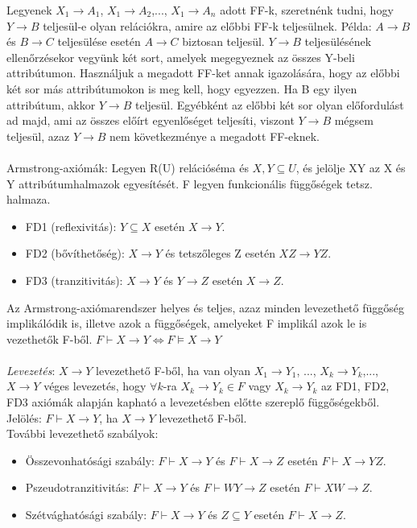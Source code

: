 \documentclass[margin=0px]{article}
\begin{document}
Legyenek $X_1 \to A_1$, $X_1 \to A_2$,..., $X_1 \to A_n$ adott FF-k, szeretnénk tudni, hogy $Y \to B$ teljesül-e olyan relációkra, amire az előbbi FF-k teljesülnek. Példa: $A \to B$ és $B \to C$ teljesülése esetén $A \to C$ biztosan teljesül. $Y \to B$ teljesülésének ellenőrzésekor vegyünk két sort, amelyek megegyeznek az összes Y-beli attribútumon. Használjuk a megadott FF-ket annak igazolására, hogy az előbbi két sor más attribútumokon is meg kell, hogy egyezzen. Ha B egy ilyen attribútum, akkor $Y \to B$ teljesül. Egyébként az előbbi két sor olyan előfordulást ad majd, ami az összes előírt egyenlőséget teljesíti, viszont $Y \to B$ mégsem teljesül, azaz $Y \to B$ nem következménye a megadott FF-eknek. \\ \\
Armstrong-axiómák: Legyen R(U) relációséma és $X,Y \subseteq U$, és jelölje XY az X és Y attribútumhalmazok egyesítését. F legyen funkcionális függőségek tetsz. halmaza. \\
\begin{itemize}
    \item FD1 (reflexivitás): $Y \subseteq X$ esetén $X \to Y$.
    \item FD2 (bővíthetőség): $X \to Y$ és tetszőleges Z esetén $XZ \to YZ$.
    \item FD3 (tranzitivitás): $X \to Y$ és $Y \to Z$ esetén $X \to Z$.
\end{itemize}
Az Armstrong-axiómarendszer helyes és teljes, azaz minden levezethető függőség implikálódik is, illetve azok a függőségek, amelyeket F implikál azok le is vezethetők F-ből. $F \vdash X \to Y \iff F \models X \to Y$\\ \\
\textit{Levezetés}: $X \to Y$ levezethető F-ből, ha van olyan $X_1 \to Y_1$, ..., $X_k \to Y_k$,..., $X \to Y$ véges levezetés, hogy $\forall k$-ra $X_k \to Y_k \in F$ vagy $X_k \to Y_k$ az FD1, FD2, FD3 axiómák alapján kapható a levezetésben előtte szereplő függőségekből. Jelölés: $F \vdash X \to Y$, ha $X \to Y$ levezethető F-ből. \\
További levezethető szabályok:
\begin{itemize}
    \item Összevonhatósági szabály: $F \vdash X \to Y$ és $F \vdash X \to Z$ esetén $F \vdash X \to YZ$.
    \item Pszeudotranzitivitás: $F \vdash X \to Y$ és $F \vdash WY \to Z$ esetén $F \vdash XW \to Z$.
    \item Szétvághatósági szabály: $F \vdash X \to Y$ és $Z \subseteq Y$ esetén $F \vdash X \to Z$.
\end{itemize}
\end{document}
